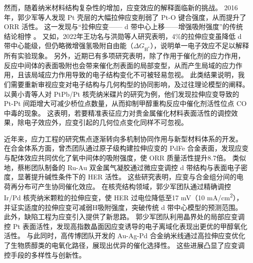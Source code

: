 然而，随着纳米材料结构复杂性的增加，应变效应的解释面临新的挑战。
2016年，郭少军等人发现 Pt 壳层的大幅拉伸应变削弱了 Pt-O 键合强度，从而提升了 ORR 活性。
这一发现与``拉伸应变—— d 带中心上移——增强吸附强度''的传统结论相悖\cite{Bu_2016} 。
又如，2022年王功名与洪勋等人研究表明，4\%的拉伸应变虽降低 d 带中心能级，但仍略微增强氢吸附自由能（$\Delta G_{\textrm{H}^{*}}$），说明单一电子效应不足以解释所有实验现象\cite{Wu_2022}。
另外，近期已有多项研究表明，除了作用于催化剂的应力作用，反应中间体的表面吸附也会带来催化剂表面的局部变型，从而产生局域的应力作用，且该局域应力作用导致的电子结构变化不可被轻易忽视\cite{Shu_2001,Pala_2004,Francis_2015,Khorshidi_2018}。
此类结果说明，我们需要重新审视应变对电子结构与几何构型的协同影响，及过往理论模型的阐释。
以黄小青等人对 PtPb/Pt 核壳纳米碟片的研究为例，他们发现拉伸应变导致的 Pt-Pt 间距增大可减少桥位点数量，从而抑制甲醇重构反应中催化剂活性位点 CO 中毒的现象\cite{E_2018}。
这表明，若要精准表征应力对贵金属催化材料表面活性的调控效果，除电子效应外，应变引起的几何位点变化同样不可忽视。

近年来，应力工程的研究焦点逐渐转向多机制协同作用与新型材料体系的开发。
在合金体系方面，曾杰团队通过原子级构建拉伸应变的 PdFe 合金表面，发现应变与配体效应共同优化了氧中间体的吸附强度，使 ORR 质量活性提升8.7倍\cite{Li_2020}。
类似地，蔡彬团队制备的 Ru-Au 双金属气凝胶通过微应变调控 d 带结构与表面电子密度，显著提升碱性条件下的 HER 活性\cite{Wei_2024}。
这些研究表明，应变与合金组分间的电荷再分布可产生协同催化效应。
在核壳结构领域，郭少军团队通过精确调控 Ir/Pd 核壳纳米颗粒的拉伸应变，使 HER 过电位降低至17
mV（10
mA/cm\textsuperscript{2}），并证实适度的拉伸应变可减弱H吸附强度，突破传统 d 带中心模型的预测范围\cite{Guo_2023a}。
此外，缺陷工程为应变引入提供了新思路。
郭少军团队利用晶界处的局部应变调控 Pt 表面活性，发现高指数晶面因应变诱导的电子离域化表现出更优的甲醇氧化活性\cite{Zhao_2021}。
与此同时，高传博团队开发的 Au-Ag-Pd 合金纳米线通过高拉伸应变优化了生物质醇类的电氧化路径，展现出优异的催化选择性\cite{Zhang_2021}。
这些进展凸显了应变调控手段的多样性与创新性。

